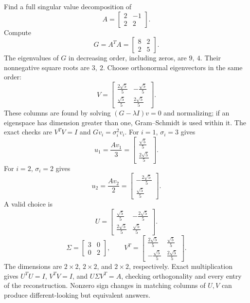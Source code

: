 \goal Find a full singular value decomposition of
\[A=\begin{bmatrix}2&-1\\2&2\end{bmatrix}.\]
Compute
\[G=A^TA=\begin{bmatrix}8&2\\2&5\end{bmatrix}.\]
The eigenvalues of $G$ in decreasing order, including zeros, are $9,\ 4$. Their nonnegative square roots are $3,\ 2$. Choose orthonormal eigenvectors in the same order:
\[V=\begin{bmatrix}\frac{2 \sqrt{5}}{5}&- \frac{\sqrt{5}}{5}\\\frac{\sqrt{5}}{5}&\frac{2 \sqrt{5}}{5}\end{bmatrix}.\]
These columns are found by solving $(G-\lambda I)v=0$ and normalizing; if an eigenspace has dimension greater than one, Gram--Schmidt is used within it. The exact checks are $V^TV=I$ and $Gv_i=\sigma_i^2v_i$.
For $i=1$, $\sigma_i=3$ gives
\[u_{1}=\frac{Av_{1}}{3}=\begin{bmatrix}\frac{\sqrt{5}}{5}\\\frac{2 \sqrt{5}}{5}\end{bmatrix}.\]
For $i=2$, $\sigma_i=2$ gives
\[u_{2}=\frac{Av_{2}}{2}=\begin{bmatrix}- \frac{2 \sqrt{5}}{5}\\\frac{\sqrt{5}}{5}\end{bmatrix}.\]
A valid choice is
\[U=\begin{bmatrix}\frac{\sqrt{5}}{5}&- \frac{2 \sqrt{5}}{5}\\\frac{2 \sqrt{5}}{5}&\frac{\sqrt{5}}{5}\end{bmatrix}.\]
\[\Sigma=\begin{bmatrix}3&0\\0&2\end{bmatrix},\qquad V^T=\begin{bmatrix}\frac{2 \sqrt{5}}{5}&\frac{\sqrt{5}}{5}\\- \frac{\sqrt{5}}{5}&\frac{2 \sqrt{5}}{5}\end{bmatrix}.\]
The dimensions are $2\times2$, $2\times2$, and $2\times2$, respectively. Exact multiplication gives $U^TU=I$, $V^TV=I$, and $U\Sigma V^T=A$, checking orthogonality and every entry of the reconstruction. Nonzero sign changes in matching columns of $U,V$ can produce different-looking but equivalent answers.



